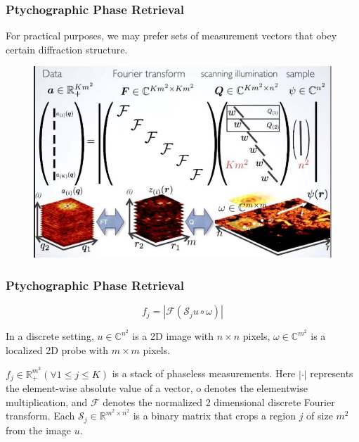 \documentclass[UTF8]{beamer}
\begin{document}
\begin{frame}[c]\frametitle{Ptychographic Phase Retrieval}

For practical purposes, we may prefer sets of measurement vectors that obey certain diffraction structure. 
\begin{figure}[H]
\centering

    \includegraphics[width=1\linewidth]{../figures0/ptycho.jpg}  
   
\end{figure}

\end{frame}

\begin{frame}[c]\frametitle{Ptychographic Phase Retrieval}
\begin{equation}
\label{basic}
f_{j}=\left|\mathcal{F}\left( \mathcal{S}_{j} u  \circ \omega \right)\right|
\end{equation}

In a discrete setting, $u \in \mathbb{C}^{n^2}$ is a 2D image with $n \times n$ pixels, $\omega \in \mathbb{C}^{m^2}$ is a localized 2D probe with $m \times m$ pixels.

$f_{j} \in \mathbb{R}_{+}^{m^2}(\forall 1 \leq j \leq K)$ is a stack of phaseless measurements. Here $|\cdot|$ represents the element-wise absolute value of a vector, o denotes the elementwise multiplication, and $\mathcal{F}$ denotes the normalized 2 dimensional discrete Fourier transform. Each $\mathcal{S}_{j} \in \mathbb{R}^{m^2 \times n^2}$ is a binary matrix that crops a region $j$ of size $m^2$ from the image $u$.


\end{frame}
\end{document}
